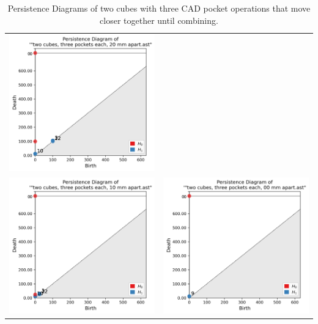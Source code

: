 \documentclass[ma]{uncgdissertationexp}
\theoremstyle{plain}
\theoremstyle{definition}
\theoremstyle{remark}
\begin{document}
\begin{table}[H]
\begin{center}
\begin{tabular}{cc}
         \includegraphics[width=3in]{Final Run, (two cubes, three pockets each, 20 mm apart) persdia.png} \\ 
         \includegraphics[width=3in]{Final Run, (two cubes, three pockets each, 10 mm apart) persdia.png} & 
         \includegraphics[width=3in]{Final Run, (two cubes, three pockets each, 00 mm apart) persdia.png} \\
\end{tabular}
\end{center}
    \caption{Persistence Diagrams of two cubes with three CAD pocket operations that move closer together until combining.}
    \label{fig:cube_two_cubes_persdia_table}
\end{table}
\end{document}
